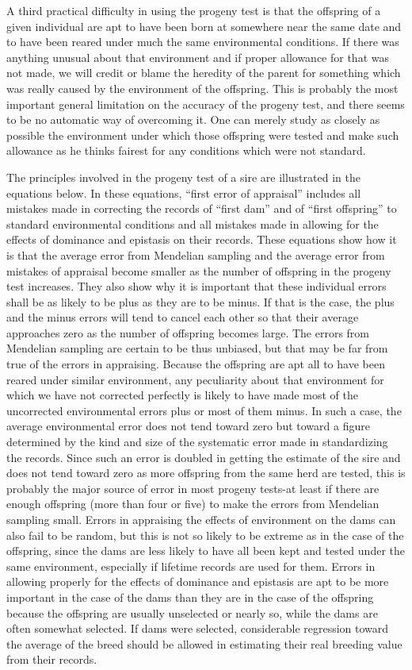 A third practical difficulty in using the progeny test is that the offspring
of a given individual are apt to have been born at somewhere
near the same date and to have been reared under much the same
environmental conditions. If there was anything unusual about that
environment and if proper allowance for that was not made, we will
credit or blame the heredity of the parent for something which was
really caused by the environment of the offspring. This is probably the
most important general limitation on the accuracy of the progeny test,
and there seems to be no automatic way of overcoming it. One can
merely study as closely as possible the environment under which those
offspring were tested and make such allowance as he thinks fairest for
any conditions which were not standard.

The principles involved in the progeny test of a sire are illustrated
in the equations below. In these equations, ``first error of appraisal''
includes all mistakes made in correcting the records of ``first dam'' and
of ``first offspring'' to standard environmental conditions and all mistakes
made in allowing for the effects of dominance and epistasis on
their records. These equations show how it is that the average error
from Mendelian sampling and the average error from mistakes of
appraisal become smaller as the number of offspring in the progeny
test increases. They also show why it is important that these individual
errors shall be as likely to be plus as they are to be minus. If that is the
case, the plus and the minus errors will tend to cancel each other so that
their average approaches zero as the number of offspring becomes large.
The errors from Mendelian sampling are certain to be thus unbiased,
but that may be far from true of the errors in appraising. Because the
offspring are apt all to have been reared under similar environment, any
peculiarity about that environment for which we have not corrected
perfectly is likely to have made most of the uncorrected environmental
errors plus or most of them minus. In such a case, the average environmental
error does not tend toward zero but toward a figure determined
by the kind and size of the systematic error made in standardizing the
records. Since such an error is doubled in getting the estimate of the
sire and does not tend toward zero as more offspring from the same herd
are tested, this is probably the major source of error in most progeny
tests-at least if there are enough offspring (more than four or five) to
make the errors from Mendelian sampling small. Errors in appraising
the effects of environment on the dams can also fail to be random, but
this is not so likely to be extreme as in the case of the offspring, since
the dams are less likely to have all been kept and tested under the same
environment, especially if lifetime records are used for them. Errors in
allowing properly for the effects of dominance and epistasis are apt to
be more important in the case of the dams than they are in the case of
the offspring because the offspring are usually unselected or nearly so,
while the dams are often somewhat selected. If dams were selected, considerable
regression toward the average of the breed should be allowed
in estimating their real breeding value from their records.

